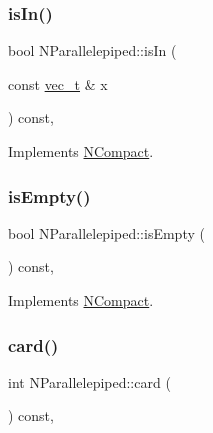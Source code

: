\mbox{\label{class_n_parallelepiped_abe05e06f34b0be7d18c098ef7821edf3}} 
\subsubsection{\texorpdfstring{isIn()}{isIn()}}
{\footnotesize\ttfamily bool N\+Parallelepiped\+::is\+In (\begin{DoxyParamCaption}\item[{const \mbox{\hyperlink{group___n_algebra_ga0a2cfc67e738a3d73e4f12098c4c07f6}{vec\+\_\+t}} \&}]{x }\end{DoxyParamCaption}) const\hspace{0.3cm}{\ttfamily [override]}, {\ttfamily [virtual]}}



Implements \mbox{\hyperlink{class_n_compact_a387e86914973c69b292782f640368680}{N\+Compact}}.

\mbox{\label{class_n_parallelepiped_a7c4271e0cd8678b6904b1f25d116cd57}} 
\subsubsection{\texorpdfstring{isEmpty()}{isEmpty()}}
{\footnotesize\ttfamily bool N\+Parallelepiped\+::is\+Empty (\begin{DoxyParamCaption}{ }\end{DoxyParamCaption}) const\hspace{0.3cm}{\ttfamily [override]}, {\ttfamily [virtual]}}



Implements \mbox{\hyperlink{class_n_compact_a574764d7ac4fe2393a739b67bf57a7f1}{N\+Compact}}.

\mbox{\label{class_n_parallelepiped_a57517e96bd3bc757cfa4e4d1d2768450}} 
\subsubsection{\texorpdfstring{card()}{card()}}
{\footnotesize\ttfamily int N\+Parallelepiped\+::card (\begin{DoxyParamCaption}{ }\end{DoxyParamCaption}) const\hspace{0.3cm}{\ttfamily [override]}, {\ttfamily [virtual]}}



